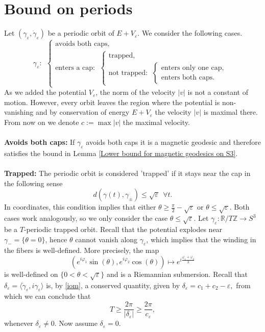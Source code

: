 \documentclass[12pt]{article}
\def\gc{{\gamma}}
\def\dgc{\dot{\gc}}
\newcommand{\R}{\mathbb{R}} %
\newcommand{\Z}{\mathbb{Z}} %
\begin{document}
\section{Bound on periods}\label{B}
Let $(\gamma_\varepsilon, \dgc_\varepsilon)$ be a periodic orbit of $E+V_\varepsilon$. We consider the following cases.
$$
\gamma_\varepsilon: \ \ \begin{cases}\text{avoids both caps}, \\
       \text{enters a cap}:\ \ \begin{cases}\text{trapped}, \\
       \text{not trapped}:\ \ \begin{cases}\text{enters only one cap}, \\
       \text{enters both caps}.
    \end{cases}
    \end{cases}
    \end{cases}
$$
As we added the potential $V_\varepsilon$, the norm of the velocity $\vert v\vert$ is not a constant of motion. However, every orbit leaves the region where the potential is non-vanishing and by conservation of energy $E+V_\varepsilon$ the velocity $\vert v\vert$ is maximal there. From now on we denote $c:=\max\vert v\vert$ the maximal velocity.\\
\ \\
\noindent
\textbf{Avoids both caps:} If $\gamma_\varepsilon$ avoids both caps it is a magnetic geodesic and therefore satisfies the bound in Lemma \ref{Lower bound for magnetic geodesics on S3}.\\
\ \\
\noindent
\textbf{Trapped:} The periodic orbit is considered 'trapped' if it stays near the cap in the following sense
$$
d(\gamma(t), \gamma_\pm) \leq \sqrt{\varepsilon} \ \ \forall t.
$$
In coordinates, this condition implies that either $\theta \geq \frac{\pi}{2} - \sqrt{\varepsilon}$ or $\theta \leq \sqrt{\varepsilon}$. Both cases work analogously, so we only consider the case $\theta \leq \sqrt{\varepsilon}$. Let $\gamma_\varepsilon: \R/T\Z \to S^3$ be a $T$-periodic trapped orbit. Recall that the potential explodes near $\gamma_- = \lbrace \theta = 0 \rbrace$, hence $\theta$ cannot vanish along $\gamma_\varepsilon$, which implies that the winding in the fibers is well-defined. More precisely, the map
$$
(e^{i\varphi_1} \sin(\theta), e^{i\varphi_2} \cos(\theta)) \mapsto e^{i\frac{\varphi_1 + \varphi_2}{2}}
$$
is well-defined on $\lbrace 0 < \theta < \sqrt{\varepsilon} \rbrace$ and is a Riemannian submersion. Recall that $\delta_\varepsilon = \langle \dot\gamma_\varepsilon, i\gamma_\varepsilon \rangle$ is, by \eqref{iom}, a conserved quantity, given by
$
\delta_{\varepsilon} = c_1 + c_2 - \varepsilon,
$
from which we can conclude that
$$
T \geq \frac{2\pi}{|\delta_\varepsilon|} \geq \frac{2\pi}{c_\varepsilon},
$$
whenever $\delta_\varepsilon \neq 0$. Now assume $\delta_\varepsilon = 0$.
\end{document}
